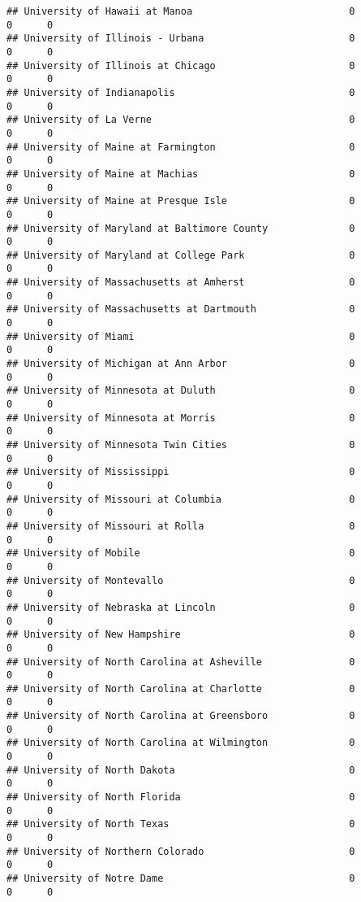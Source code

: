 \documentclass[
]{article}
\begin{document}
\begin{verbatim}
## University of Hawaii at Manoa                           0          0      0
## University of Illinois - Urbana                         0          0      0
## University of Illinois at Chicago                       0          0      0
## University of Indianapolis                              0          0      0
## University of La Verne                                  0          0      0
## University of Maine at Farmington                       0          0      0
## University of Maine at Machias                          0          0      0
## University of Maine at Presque Isle                     0          0      0
## University of Maryland at Baltimore County              0          0      0
## University of Maryland at College Park                  0          0      0
## University of Massachusetts at Amherst                  0          0      0
## University of Massachusetts at Dartmouth                0          0      0
## University of Miami                                     0          0      0
## University of Michigan at Ann Arbor                     0          0      0
## University of Minnesota at Duluth                       0          0      0
## University of Minnesota at Morris                       0          0      0
## University of Minnesota Twin Cities                     0          0      0
## University of Mississippi                               0          0      0
## University of Missouri at Columbia                      0          0      0
## University of Missouri at Rolla                         0          0      0
## University of Mobile                                    0          0      0
## University of Montevallo                                0          0      0
## University of Nebraska at Lincoln                       0          0      0
## University of New Hampshire                             0          0      0
## University of North Carolina at Asheville               0          0      0
## University of North Carolina at Charlotte               0          0      0
## University of North Carolina at Greensboro              0          0      0
## University of North Carolina at Wilmington              0          0      0
## University of North Dakota                              0          0      0
## University of North Florida                             0          0      0
## University of North Texas                               0          0      0
## University of Northern Colorado                         0          0      0
## University of Notre Dame                                0          0      0

\end{verbatim}
\end{document}
